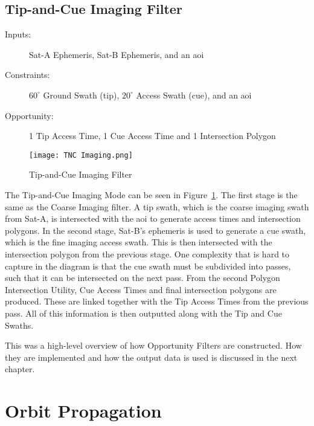 \subsection{Tip-and-Cue Imaging Filter}

\begin{description} 

    \item[Inputs:]  Sat-A Ephemeris, Sat-B Ephemeris, and  an \gls{aoi}

    \item[Constraints:] $60^\circ$ Ground Swath (tip), $20^\circ$ Access Swath (cue), and an \gls{aoi}

    \item[Opportunity:] 1 Tip Access Time, 1 Cue Access Time and 1 Intersection Polygon

\end{description} 

\begin{figure}[h]
    \centering
    \texttt{[image: TNC Imaging.png]} 
    \caption{Tip-and-Cue Imaging Filter}
    \label{fig:filter-2} 
\end{figure}


The Tip-and-Cue Imaging Mode can be seen in Figure~\ref{fig:filter-2}. The
first stage is the same as the Coarse Imaging filter. A tip swath, which is the
coarse imaging swath from Sat-A, is intersected with the \gls{aoi} to generate
access times and intersection polygons. In the second stage, Sat-B's ephemeris
is used to generate a cue swath, which is the fine imaging access swath. This
is then intersected with the intersection polygon from the previous stage. One
complexity that is hard to capture in the diagram is that the cue swath must be
subdivided into passes, such that it can be intersected on the next pass. From
the second Polygon Intersection Utility, Cue Access Times and final
intersection polygons are produced. These are linked together with the Tip
Access Times from the previous pass. All of this information is then outputted
along with the Tip and Cue Swaths.

This was a high-level overview of how Opportunity Filters are constructed. How
they are implemented and how the output data is used is discussed in the next
chapter.


\section{Orbit Propagation}

